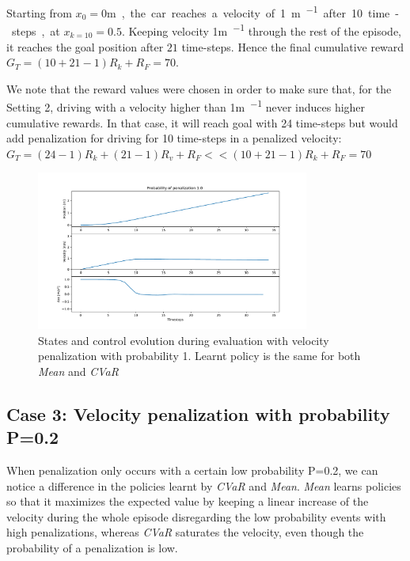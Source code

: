 Starting from $x_0=0$\si\metre, the car reaches a velocity of 1\si{\metre\per\ts} after 
10 time-steps, at $x_{k=10}=0.5$. Keeping velocity 1\si{\metre\per\ts} through 
the rest of the episode, it reaches the goal position after $21$ time-steps. 
Hence the final cumulative reward $G_T= (10+21-1) R_{k} + R_{F}=70$.

We note that the reward values were chosen in order to make sure that, for the Setting 2,
driving with a velocity higher than 1\si{\metre\per\ts} never induces higher cumulative
rewards. In that case, it will reach goal with 24 time-steps
but would add penalization for driving for 10 time-steps in a penalized velocity:\\
$G_T= (24-1)R_{k} + (21-1)R_{v} + R_{F} << (10+21-1) R_{k} + R_{F}=70$

\begin{figure}[ht]
        \centering
        \includegraphics[width=0.8\textwidth]{images/Car/CVAR/Trajectory_penal.pdf}
        \caption{States and control evolution during evaluation with velocity penalization
        with probability 1.
        Learnt policy is the same for both \textit{Mean} and \textit{CVaR}}
        \label{traj1_penal1}
    
\end{figure}

\newpage
\subsection{Case 3: Velocity penalization with probability P=0.2 }
When penalization only occurs with a certain low probability P=0.2, we can notice a difference
in the policies learnt by \textit{CVaR} and \textit{Mean}.
\textit{Mean} learns policies so that it maximizes the expected
value by keeping a linear increase of the velocity during the whole episode disregarding the low probability events with high penalizations,
whereas \textit{CVaR} saturates the velocity, even though the
probability of a penalization is low.

